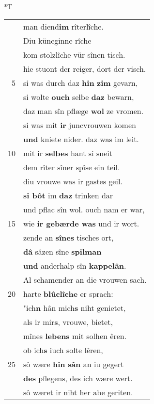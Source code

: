 \documentclass[8pt,a4paper,notitlepage]{article}
\begin{document}
\begin{table}[ht]
\begin{minipage}[t]{0.5\linewidth}
\end{minipage}
\hspace{0.5cm}
\begin{minipage}[t]{0.5\linewidth}
\small
\begin{center}*T
\end{center}
\begin{tabular}{rl}
 & man diend\textbf{im} rîterlîche.\\ 
 & Diu küneginne rîche\\ 
 & kom stolzlîche vür sînen tisch.\\ 
 & hie stuont der reiger, dort der visch.\\ 
5 & si was durch daz \textbf{hin} \textbf{zim} gevarn,\\ 
 & si wolte \textbf{ouch} selbe \textbf{daz} bewarn,\\ 
 & daz man sîn pflæge \textbf{wol} ze vromen.\\ 
 & si was mit \textbf{ir} juncvrouwen komen\\ 
 & \textbf{und} kniete nider. daz was im leit.\\ 
10 & mit ir \textbf{selbes} hant si sneit\\ 
 & dem rîter sîner spîse ein teil.\\ 
 & diu vrouwe was ir gastes geil.\\ 
 & \textbf{si bôt} im \textbf{daz} trinken dar\\ 
 & und pflac sîn wol. ouch nam er war,\\ 
15 & wie \textbf{ir gebærde was} und ir wort.\\ 
 & zende an \textbf{sînes} tisches ort,\\ 
 & \textbf{dâ} sâzen sîne \textbf{spilman}\\ 
 & \textbf{und} anderhalp sîn \textbf{kappelân}.\\ 
 & Al schamender an die vrouwen sach.\\ 
20 & harte \textbf{blûclîche} er sprach:\\ 
 & "ich\textbf{n} hân mich\textbf{s} niht genietet,\\ 
 & als ir mir\textbf{s}, vrouwe, bietet,\\ 
 & mînes \textbf{lebens} mit solhen êren.\\ 
 & ob ich\textbf{s} iuch solte lêren,\\ 
25 & sô wære \textbf{hin} \textbf{sân} an iu gegert\\ 
 & \textbf{des} pflegens, des ich wære wert.\\ 
 & sô wæret ir niht her abe geriten.\\ 

\end{tabular}
\end{minipage}
\end{table}
\end{document}
